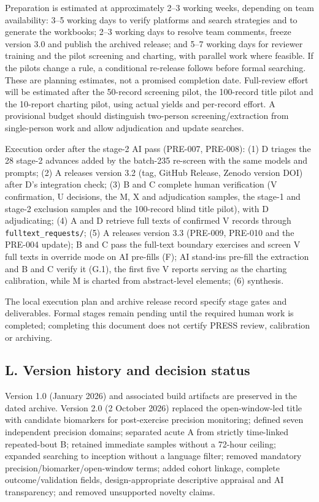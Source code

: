 \documentclass[
  11pt,
  a4paper,
]{article}
\begin{document}
Preparation is estimated at approximately 2--3 working weeks, depending
on team availability: 3--5 working days to verify platforms and search
strategies and to generate the workbooks; 2--3 working days to resolve
team comments, freeze version 3.0 and publish the archived release; and
5--7 working days for reviewer training and the pilot screening and
charting, with parallel work where feasible. If the pilots change a
rule, a conditional re-release follows before formal searching. These
are planning estimates, not a promised completion date. Full-review
effort will be estimated after the 50-record screening pilot, the
100-record title pilot and the 10-report charting pilot, using actual
yields and per-record effort. A provisional budget should distinguish
two-person screening/extraction from single-person work and allow
adjudication and update searches.

Execution order after the stage-2 AI pass (PRE-007, PRE-008): (1) D
triages the 28 stage-2 advances added by the batch-235 re-screen with
the same models and prompts; (2) A releases version 3.2 (tag, GitHub
Release, Zenodo version DOI) after D's integration check; (3) B and C
complete human verification (V confirmation, U decisions, the M, X and
adjudication samples, the stage-1 and stage-2 exclusion samples and the
100-record blind title pilot), with D adjudicating; (4) A and D retrieve
full texts of confirmed V records through \texttt{fulltext\_requests/};
(5) A releases version 3.3 (PRE-009, PRE-010 and the PRE-004 update); B
and C pass the full-text boundary exercises and screen V full texts in
override mode on AI pre-fills (F); AI stand-ins pre-fill the extraction
and B and C verify it (G.1), the first five V reports serving as the
charting calibration, while M is charted from abstract-level elements;
(6) synthesis.

The local execution plan and archive release record specify stage gates
and deliverables. Formal stages remain pending until the required human
work is completed; completing this document does not certify PRESS
review, calibration or archiving.

\subsection{L. Version history and decision
status}\label{l.-version-history-and-decision-status}

Version 1.0 (January 2026) and associated build artifacts are preserved
in the dated archive. Version 2.0 (2 October 2026) replaced the
open-window-led title with candidate biomarkers for post-exercise
precision monitoring; defined seven independent precision domains;
separated acute A from strictly time-linked repeated-bout B; retained
immediate samples without a 72-hour ceiling; expanded searching to
inception without a language filter; removed mandatory
precision/biomarker/open-window terms; added cohort linkage, complete
outcome/validation fields, design-appropriate descriptive appraisal and
AI transparency; and removed unsupported novelty claims.
\end{document}
